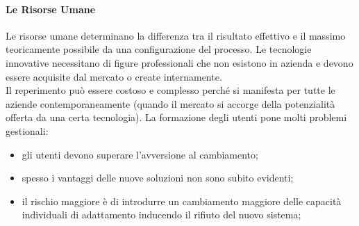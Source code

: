 \paragraph{Le Risorse Umane}\label{par:bpr_le_risorse_umane} %
Le risorse umane determinano la differenza tra il risultato effettivo e il massimo teoricamente possibile da una configurazione del processo.
Le tecnologie innovative necessitano di figure professionali che non esistono in azienda e devono essere acquisite dal mercato o create internamente.
\\
Il reperimento può essere costoso e complesso perché si manifesta per tutte le aziende contemporaneamente (quando il mercato si accorge della potenzialità offerta da una certa tecnologia).
La formazione degli utenti pone molti problemi gestionali:
\begin{itemize}
    \item gli utenti devono superare l'avversione al cambiamento;
    \item spesso i vantaggi delle nuove soluzioni non sono subito evidenti;
    \item il rischio maggiore è di introdurre un cambiamento maggiore delle capacità individuali di adattamento inducendo il rifiuto del nuovo sistema;
\end{itemize}
%
